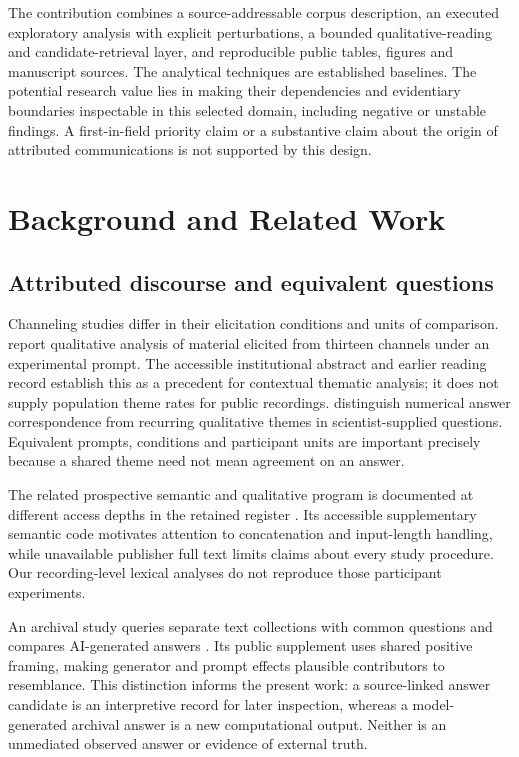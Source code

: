 The contribution combines a source-addressable corpus description, an executed exploratory analysis with explicit perturbations, a bounded qualitative-reading and candidate-retrieval layer, and reproducible public tables, figures and manuscript sources. The analytical techniques are established baselines. The potential research value lies in making their dependencies and evidentiary boundaries inspectable in this selected domain, including negative or unstable findings. A first-in-field priority claim or a substantive claim about the origin of attributed communications is not supported by this design.

\section{Background and Related Work}
\subsection{Attributed discourse and equivalent questions}
Channeling studies differ in their elicitation conditions and units of comparison. \citet{anastasia2020qualitative} report qualitative analysis of material elicited from thirteen channels under an experimental prompt. The accessible institutional abstract and earlier reading record establish this as a precedent for contextual thematic analysis; it does not supply population theme rates for public recordings. \citet{wahbeh2023answers} distinguish numerical answer correspondence from recurring qualitative themes in scientist-supplied questions. Equivalent prompts, conditions and participant units are important precisely because a shared theme need not mean agreement on an answer.

The related prospective semantic and qualitative program is documented at different access depths in the retained register \citep{wahbeh2026semantic,wahbeh2026qualitative}. Its accessible supplementary semantic code motivates attention to concatenation and input-length handling, while unavailable publisher full text limits claims about every study procedure. Our recording-level lexical analyses do not reproduce those participant experiments.

An archival study queries separate text collections with common questions and compares AI-generated answers \citep{wahbeh2026records}. Its public supplement uses shared positive framing, making generator and prompt effects plausible contributors to resemblance. This distinction informs the present work: a source-linked answer candidate is an interpretive record for later inspection, whereas a model-generated archival answer is a new computational output. Neither is an unmediated observed answer or evidence of external truth.

